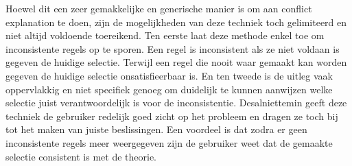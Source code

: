 Hoewel dit een zeer gemakkelijke en generische manier is om aan conflict explanation te doen, zijn de mogelijkheden van deze techniek toch gelimiteerd en niet altijd voldoende toereikend. Ten eerste laat deze methode enkel toe om inconsistente regels op te sporen. Een regel is inconsistent als ze niet voldaan is gegeven de huidige selectie. Terwijl een regel die nooit waar gemaakt kan worden gegeven de huidige selectie onsatisfieerbaar is. En ten tweede is de uitleg vaak oppervlakkig en niet specifiek genoeg om duidelijk te kunnen aanwijzen welke selectie juist verantwoordelijk is voor de inconsistentie. 
Desalniettemin geeft deze techniek de gebruiker redelijk goed zicht op het probleem en dragen ze toch bij tot het maken van juiste beslissingen. Een voordeel is dat zodra er geen inconsistente regels meer weergegeven zijn de gebruiker weet dat de gemaakte selectie consistent is met de theorie. 

